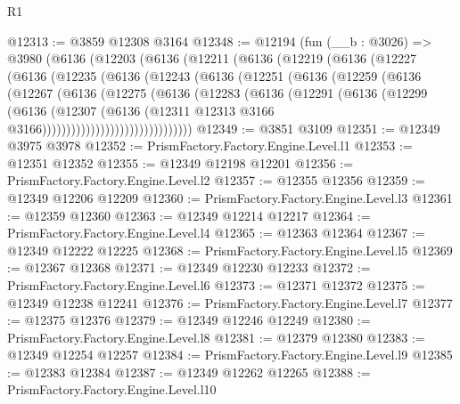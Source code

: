 \begin{lexlean}{R1}
\begin{coremodule}
@12313 := @3859 @12308 @3164
@12348 := @12194
    (fun (__b : @3026) =>
    @3980
      (@6136
        (@12203
          (@6136
            (@12211
              (@6136
                (@12219
                  (@6136
                    (@12227
                      (@6136
                        (@12235
                          (@6136
                            (@12243
                              (@6136
                                (@12251
                                  (@6136
                                    (@12259
                                      (@6136
                                        (@12267
                                          (@6136
                                            (@12275
                                              (@6136
                                                (@12283
                                                  (@6136
                                                    (@12291
                                                      (@6136
                                                        (@12299
                                                          (@6136
                                                            (@12307
                                                              (@6136
                                                                (@12311
                                                                  @12313
                                                                  @3166
                                                                  @3166)))))))))))))))))))))))))))))))
@12349 := @3851 @3109
@12351 := @12349 @3975 @3978
@12352 := PrismFactory.Factory.Engine.Level.l1
@12353 := @12351 @12352
@12355 := @12349 @12198 @12201
@12356 := PrismFactory.Factory.Engine.Level.l2
@12357 := @12355 @12356
@12359 := @12349 @12206 @12209
@12360 := PrismFactory.Factory.Engine.Level.l3
@12361 := @12359 @12360
@12363 := @12349 @12214 @12217
@12364 := PrismFactory.Factory.Engine.Level.l4
@12365 := @12363 @12364
@12367 := @12349 @12222 @12225
@12368 := PrismFactory.Factory.Engine.Level.l5
@12369 := @12367 @12368
@12371 := @12349 @12230 @12233
@12372 := PrismFactory.Factory.Engine.Level.l6
@12373 := @12371 @12372
@12375 := @12349 @12238 @12241
@12376 := PrismFactory.Factory.Engine.Level.l7
@12377 := @12375 @12376
@12379 := @12349 @12246 @12249
@12380 := PrismFactory.Factory.Engine.Level.l8
@12381 := @12379 @12380
@12383 := @12349 @12254 @12257
@12384 := PrismFactory.Factory.Engine.Level.l9
@12385 := @12383 @12384
@12387 := @12349 @12262 @12265
@12388 := PrismFactory.Factory.Engine.Level.l10

\end{coremodule}
\end{lexlean}
